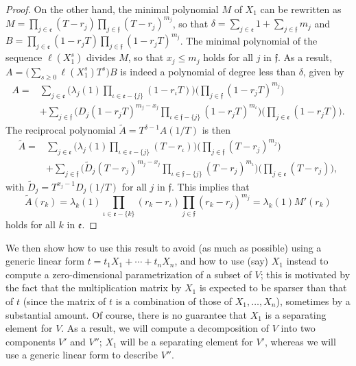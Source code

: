 \documentclass[12pt]{article}
\begin{document}
\begin{proof}
	On the other hand, the minimal polynomial $M$ of $X_1$ can be rewritten as $M=\prod_{j\in
		\mathfrak{e}}(T-r_j) \prod_{j \in \mathfrak{f}}(T-r_j)^{m_j}$, so
	that $\delta=\sum_{j \in \mathfrak{e}} 1 + \sum_{j\in \mathfrak{f}}
	m_j$ and $B=\prod_{j\in \mathfrak{e}}(1-r_j T) \prod_{j \in
		\mathfrak{f}}(1-r_j T)^{m_j}$. The minimal polynomial
	of the sequence $\ell(X_1^s)$ divides $M$, so that $x_j \le m_j$ holds for all $j$ in
	$\mathfrak{f}$.
	As a result,  $A =\big ( \sum_{s \ge 0} \ell(X_1^s) T^s \big ) B$ is 
	indeed a polynomial of degree less than $\delta$, given by
	\begin{align*}
	A=&
	\sum_{j \in \mathfrak{e}}
	\Big(
	\lambda_j(1) \prod_{\iota \in \mathfrak{e}-\{j\}}(1-r_\iota T)\Big)
	\Big(\prod_{j \in \mathfrak{f}}(1-r_j T)^{m_j} \Big)\\
	&+
	\sum_{j\in \mathfrak{f}}
	\Big(D_j (1-r_j T)^{m_j-x_j}
	\prod_{\iota \in \mathfrak{f}-\{j\}}(1-r_j T)^{m_\iota}\Big)
	\Big(\prod_{j\in \mathfrak{e}} (1-r_jT) \Big).
	\end{align*}
	The reciprocal polynomial $\tilde A=T^{\delta-1} A(1/T)$ is then
	\begin{align*}
	\tilde  A=&
	\sum_{j \in \mathfrak{e}}
	\Big(
	\lambda_j(1) \prod_{\iota \in \mathfrak{e}-\{j\}}(T-r_\iota)\Big)
	\Big(\prod_{j \in \mathfrak{f}}(T-r_j)^{m_j} \Big)\\
	&+
	\sum_{j\in \mathfrak{f}}
	\Big(\tilde D_j (T-r_j)^{m_j-x_j}
	\prod_{\iota \in \mathfrak{f}-\{j\}}(T-r_j)^{m_\iota}\Big)
	\Big(\prod_{j\in \mathfrak{e}} (T-r_j) \Big),
	\end{align*}
	with $\tilde D_j = T^{x_j-1} D_j(1/T)$ for all $j$ in $\mathfrak{f}$.
	This implies that $$\tilde A(r_k) =\lambda_k(1) 
	\prod_{\iota \in \mathfrak{e}-\{k\}}(r_k-r_\iota)
	\prod_{j \in \mathfrak{f}}(r_k-r_j)^{m_j} = \lambda_k(1) M'(r_k)$$ 
	holds for all $k$ in $\mathfrak{e}$.
\end{proof}

We then show how to use this result to avoid (as much as possible)
using a generic linear form $t=t_1 X_1 + \cdots + t_n X_n$, and how to
use (say) $X_1$ instead to compute a zero-dimensional parametrization
of a subset of $V$; this is motivated by the fact that the
multiplication matrix by $X_1$ is expected to be sparser than that of
$t$ (since the matrix of $t$ is a combination of those of
$X_1,\dots,X_n$), sometimes by a substantial amount. Of course, there
is no guarantee that $X_1$ is a separating element for $V$. As a
result, we will compute a decomposition of $V$ into two components
$V'$ and $V''$; $X_1$ will be a separating element for $V'$, whereas
we will use a generic linear form to describe $V''$.
\end{document}
